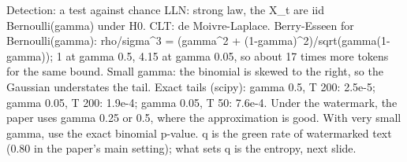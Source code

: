 \documentclass[aspectratio=169,10pt,t]{beamer}
\begin{document}
\begin{frame}{Detection: a test against chance}
{  LLN: strong law, the X\_t are iid Bernoulli(gamma) under H0. CLT: de Moivre-Laplace.
  Berry-Esseen for Bernoulli(gamma): rho/sigma\^{}3 = (gamma\^{}2 + (1-gamma)\^{}2)/sqrt(gamma(1-gamma)); 1 at gamma 0.5, 4.15 at gamma 0.05, so about 17 times more tokens for the same bound.
  Small gamma: the binomial is skewed to the right, so the Gaussian understates the tail. Exact tails (scipy): gamma 0.5, T 200: 2.5e-5; gamma 0.05, T 200: 1.9e-4; gamma 0.05, T 50: 7.6e-4.
  Under the watermark, the paper uses gamma 0.25 or 0.5, where the approximation is good. With very small gamma, use the exact binomial p-value.
  q is the green rate of watermarked text (0.80 in the paper's main setting); what sets q is the entropy, next slide.}
\end{frame}
\end{document}
